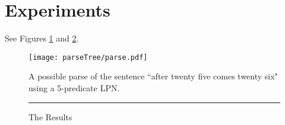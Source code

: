 \documentclass[11pt, twocolumn]{article}
\begin{document}
\section{Experiments}

See Figures \ref{fig:parseexample} and \ref{fig:results}.

\begin{figure}[t]
		\texttt{[image: parseTree/parse.pdf]}
		\caption{A possible parse of the sentence ``after twenty five comes twenty six" using a 5-predicate LPN.}
                \label{fig:parseexample}
\end{figure}

\begin{figure}
	\rule{\linewidth}{3in}
	\caption{The Results}
	\label{fig:results}
\end{figure}
\end{document}
